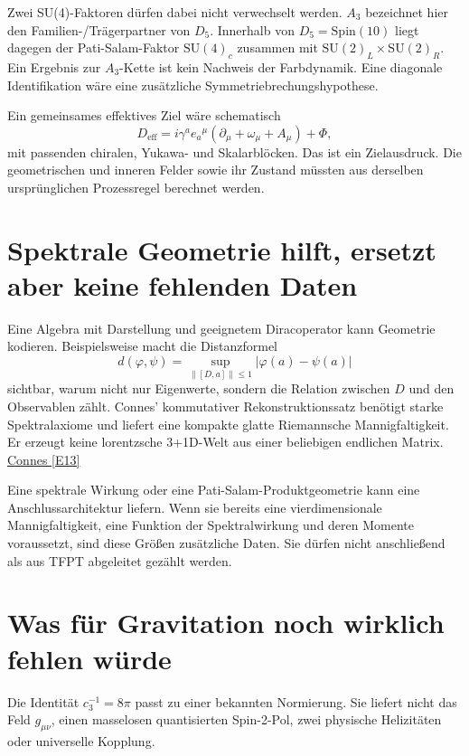 Zwei SU(4)-Faktoren dürfen dabei nicht verwechselt werden. $A_3$ bezeichnet hier den Familien-/Trägerpartner von $D_5$. Innerhalb von $D_5=\mathrm{Spin}(10)$ liegt dagegen der Pati-Salam-Faktor $\mathrm{SU}(4)_c$ zusammen mit $\mathrm{SU}(2)_L\times\mathrm{SU}(2)_R$. Ein Ergebnis zur $A_3$-Kette ist kein Nachweis der Farbdynamik. Eine diagonale Identifikation wäre eine zusätzliche Symmetriebrechungshypothese.

Ein gemeinsames effektives Ziel wäre schematisch
\begin{equation}
D_{\mathrm{eff}}=i\gamma^ae_a{}^\mu(\partial_\mu+\omega_\mu+A_\mu)+\Phi,
\end{equation}
mit passenden chiralen, Yukawa- und Skalarblöcken. Das ist ein Zielausdruck. Die geometrischen und inneren Felder sowie ihr Zustand müssten aus derselben ursprünglichen Prozessregel berechnet werden.

\section{Spektrale Geometrie hilft, ersetzt aber keine fehlenden Daten}
Eine Algebra mit Darstellung und geeignetem Diracoperator kann Geometrie kodieren. Beispielsweise macht die Distanzformel
\begin{equation}
d(\varphi,\psi)=\sup_{\|[D,a]\|\le1}|\varphi(a)-\psi(a)|
\end{equation}
sichtbar, warum nicht nur Eigenwerte, sondern die Relation zwischen $D$ und den Observablen zählt. Connes' kommutativer Rekonstruktionssatz benötigt starke Spektralaxiome und liefert eine kompakte glatte Riemannsche Mannigfaltigkeit. Er erzeugt keine lorentzsche 3+1D-Welt aus einer beliebigen endlichen Matrix. \href{https://arxiv.org/abs/0810.2088}{Connes [E13]}

Eine spektrale Wirkung oder eine Pati-Salam-Produktgeometrie kann eine Anschlussarchitektur liefern. Wenn sie bereits eine vierdimensionale Mannigfaltigkeit, eine Funktion der Spektralwirkung und deren Momente voraussetzt, sind diese Größen zusätzliche Daten. Sie dürfen nicht anschließend als aus TFPT abgeleitet gezählt werden.

\section{Was für Gravitation noch wirklich fehlen würde}
Die Identität $c_3^{-1}=8\pi$ passt zu einer bekannten Normierung. Sie liefert nicht das Feld $g_{\mu\nu}$, einen masselosen quantisierten Spin-2-Pol, zwei physische Helizitäten oder universelle Kopplung.

